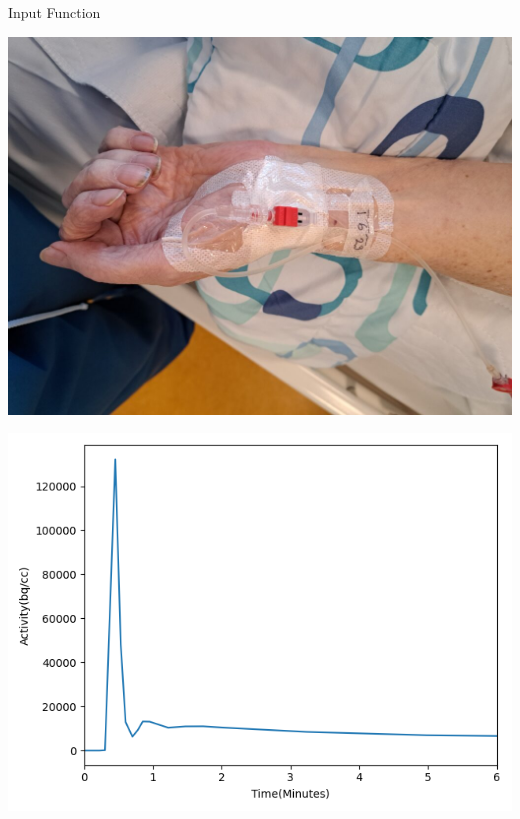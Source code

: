 \documentclass[aspectratio=169]{beamer}
\begin{document}
\begin{frame}{Input Function}
	\begin{center}
		\begin{minipage}{0.40\textwidth}
			\includegraphics[width=\linewidth]{catheter2.jpg}
		\end{minipage}
		\begin{minipage}{0.40\textwidth}
			\includegraphics[width=\linewidth]{aif.png}
		\end{minipage}
		\vfill
	\end{center}

\end{frame}
\end{document}
